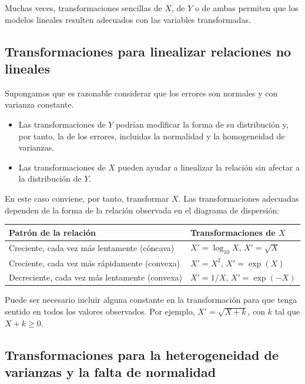 Muchas veces, transformaciones sencillas de $X$, de $Y$ o de ambas permiten que los modelos
lineales resulten adecuados con las variables transformadas.

\subsection{Transformaciones para linealizar relaciones no lineales}

Supongamos que es razonable considerar que los errores son normales y con varianza constante.
\begin{itemize}
  \item Las transformaciones de $Y$ podrían modificar la forma de su distribución y, por tanto,
    la de los errores, incluidas la normalidad y la homogeneidad de varianzas.
  \item Las transformaciones de $X$ pueden ayudar a linealizar la relación sin afectar a la
    distribución de $Y$.
\end{itemize}
En este caso conviene, por tanto, transformar $X$. Las transformaciones adecuadas dependen de la
forma de la relación observada en el diagrama de dispersión:
\begin{center}
  \renewcommand{\arraystretch}{1.3}
  \begin{tabular}{ll}
    \toprule
    Patrón de la relación & Transformaciones de $X$ \\
    \midrule
    Creciente, cada vez más lentamente (cóncava) & $X'=\log_{10}X$, \quad $X'=\sqrt{X}$ \\
    Creciente, cada vez más rápidamente (convexa) & $X'=X^2$, \quad $X'=\exp(X)$ \\
    Decreciente, cada vez más lentamente (convexa) & $X'=1/X$, \quad $X'=\exp(-X)$ \\
    \bottomrule
  \end{tabular}
\end{center}

\begin{nota}
  Puede ser necesario incluir alguna constante en la transformación para que tenga sentido en
  todos los valores observados. Por ejemplo, $X'=\sqrt{X+k}$, con $k$ tal que $X+k\ge0$.
\end{nota}

\subsection{Transformaciones para la heterogeneidad de varianzas y la falta de normalidad}

